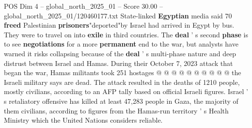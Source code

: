 \begin{textsample}{POS Dim 4 – global\_north\_2025\_01 – Score 30.00 – global\_north\_2025\_01/120460177.txt}
State-linked \textbf{Egyptian} media said 70 \textbf{freed} Palestinian \textbf{prisoners}"deported"by Israel had arrived in Egypt by bus.
They were to travel on into \textbf{exile} in third countries.
The \textbf{deal} ' s second \textbf{phase} is to see \textbf{negotiations} for a more \textbf{permanent} end to the war, but analysts have warned it risks collapsing because of the \textbf{deal} ' s multi-phase nature and deep distrust between Israel and Hamas.
During their October 7, 2023 attack that began the war, Hamas militants took 251 hostages @ @ @ @ @ @ @ @ @ @ the Israeli military says are dead.
The attack resulted in the deaths of 1210 people, mostly civilians, according to an AFP tally based on official Israeli figures.
Israel ' s retaliatory offensive has killed at least 47,283 people in Gaza, the majority of them civilians, according to figures from the Hamas-run territory ' s Health Ministry which the United Nations considers reliable.

\end{textsample}
